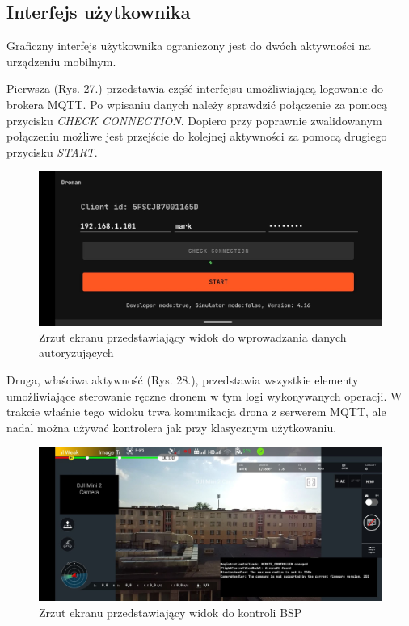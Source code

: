\subsection{Interfejs użytkownika}
 Graficzny interfejs użytkownika ograniczony jest do dwóch aktywności na urządzeniu mobilnym. 
 
 Pierwsza (Rys. 27.) przedstawia część interfejsu umożliwiającą logowanie do brokera MQTT. Po wpisaniu danych należy sprawdzić połączenie za pomocą przycisku \textit{CHECK CONNECTION}. Dopiero przy poprawnie zwalidowanym połączeniu możliwe jest przejście do kolejnej aktywności za pomocą drugiego przycisku \textit{START}.

\begin{figure}[!ht]
\begin{center}
  \includegraphics[width=16cm]{./Obrazy/droman2.jpg}
  \caption{Zrzut ekranu przedstawiający widok do wprowadzania danych autoryzujących}
  \end{center}
\end{figure}

Druga, właściwa aktywność (Rys. 28.), przedstawia wszystkie elementy umożliwiające sterowanie ręczne dronem w tym logi wykonywanych operacji. W trakcie właśnie tego widoku trwa komunikacja drona z serwerem MQTT, ale nadal można używać kontrolera jak przy klasycznym użytkowaniu.

\begin{figure}[!ht]
\begin{center}
  \includegraphics[width=14cm]{./Obrazy/droman1.jpg}
  \caption{Zrzut ekranu przedstawiający widok do kontroli BSP}
  \end{center}
\end{figure}
  
